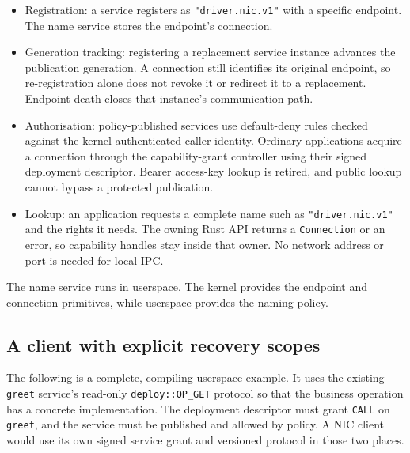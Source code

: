 \begin{itemize}
    \item Registration: a service registers as \texttt{"driver.nic.v1"}
        with a specific endpoint. The name service stores the endpoint's
        connection.
    \item Generation tracking: registering a replacement service instance
        advances the publication generation. A connection still identifies its
        original endpoint, so re-registration alone does not revoke it or
        redirect it to a replacement.
        Endpoint death closes that instance's communication path.
    \item Authorisation: policy-published services use default-deny rules
        checked against the kernel-authenticated caller identity. Ordinary
        applications acquire a connection through the capability-grant controller
        using their signed deployment descriptor. Bearer access-key lookup is
        retired, and public lookup cannot bypass a protected publication.
    \item Lookup: an application requests a complete name such as
        \texttt{"driver.nic.v1"} and the rights it needs. The owning Rust API
        returns a \texttt{Connection} or an error, so capability handles stay
        inside that owner. No network address or port is needed for local IPC.
\end{itemize}

The name service runs in userspace. The kernel provides the endpoint and
connection primitives, while userspace provides the naming policy.

\subsection{A client with explicit recovery scopes}
\label{sec:reconnecting-client}

The following is a complete, compiling userspace example. It uses the existing
\texttt{greet} service's read-only \texttt{deploy::OP\_GET} protocol so that the
business operation has a concrete implementation. The deployment descriptor
must grant \texttt{CALL} on \texttt{greet}, and the service must be published and
allowed by policy. A NIC client would use its own signed service grant and
versioned protocol in those two places.


